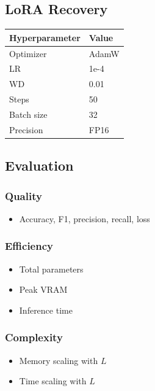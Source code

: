 \subsection{LoRA Recovery}

\begin{table}[H]
\centering
\small
\begin{tabular}{ll}
\toprule
\textbf{Hyperparameter} & \textbf{Value} \\
\midrule
Optimizer & AdamW \\
LR & 1e-4 \\
WD & 0.01 \\
Steps & 50 \\
Batch size & 32 \\
Precision & FP16 \\
\bottomrule
\end{tabular}
\end{table}

\subsection{Evaluation}

\subsubsection{Quality}
\begin{itemize}
\item Accuracy, F1, precision, recall, loss

\end{itemize}
\subsubsection{Efficiency}
\begin{itemize}
\item Total parameters
\item Peak VRAM
\item Inference time

\end{itemize}
\subsubsection{Complexity}
\begin{itemize}
\item Memory scaling with $L$
\item Time scaling with $L$

\end{itemize}
